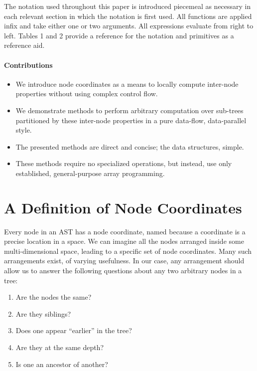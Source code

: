 \documentclass[pldi]{sigplanconf-pldi15}
\begin{document}
The notation used throughout this paper is introduced piecemeal as necessary in each relevant section in 
which the notation is first used. All functions are applied infix and take either one or two arguments. All 
expressions evaluate from right to left. Tables 1 and 2 provide a reference for the notation and primitives 
as a reference aid.

\paragraph{Contributions}

\begin{itemize}[noitemsep]
\item We introduce node coordinates as a means to locally compute inter-node properties without using complex 
control flow.
\item We demonstrate methods to perform arbitrary computation over sub-trees partitioned by these 
inter-node properties in a pure data-flow, data-parallel style.
\item The presented methods are direct and concise; the data structures, simple.
\item These methods require no specialized operations, but instead, use only established, general-purpose 
array programming.
\end{itemize}
\section{A Definition of Node Coordinates}

Every node in an AST has a node coordinate, named because a coordinate is a precise location in a space. 
We can imagine all the nodes arranged inside some multi-dimensional space, leading to a specific set of 
node coordinates. Many such arrangements exist, of varying usefulness. In our case, any arrangement 
should allow us to answer the following questions about any two arbitrary nodes in a tree:

\begin{enumerate}[noitemsep]
\item Are the nodes the same?
\item Are they siblings?
\item Does one appear “earlier” in the tree?
\item Are they at the same depth?
\item Is one an ancestor of another?
\end{enumerate}
\end{document}
